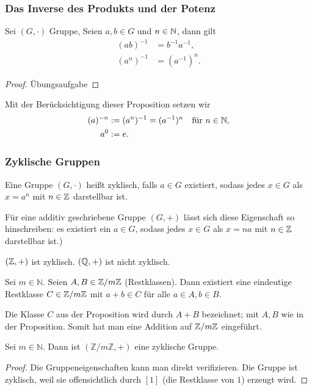 \subsubsection{Das Inverse des Produkts und der Potenz}
\begin{propn}
	Sei $ (G, \cdot) $ Gruppe, Seien $ a, b \in G $ und $ n \in \mathbb N $, dann gilt
	\begin{align}
		(ab)^{-1} &= b^{-1} a^{-1},\\
		(a^{n})^{-1} &= (a^{-1})^{n}.
	\end{align}
\end{propn}
\begin{proof}
	Übungsaufgabe
\end{proof}

\noindent Mit der Berücksichtigung dieser Proposition setzen wir 
\begin{align*}
	(a)^{-n} &:= (a^{n})^{-1} = (a^{-1})^{n} \quad\text{für } n \in \mathbb N,\\
	a^{0} &:= e. 
\end{align*}

\subsubsection{Zyklische Gruppen}
Eine Gruppe $ (G, \cdot) $ heißt zyklisch, falls $ a \in G $ existiert, sodass jedes $ x \in G $ als $ x = a^n $ mit $ n \in \mathbb Z $ darstellbar ist. 

Für eine additiv geschriebene Gruppe $ (G, +) $ lässt sich diese Eigenschaft so hinschreiben: es existiert ein $ a \in G $, sodass jedes $ x \in G $ als $ x = na $ mit $ n \in \mathbb Z $ darstellbar ist.)


\begin{bsp}
	$ (\mathbb Z, +) $ ist zyklisch. $ (\mathbb Q, +) $ ist nicht zyklisch.
\end{bsp}

\begin{propn}
	Sei $ m \in \mathbb{N} $. Seien $ A,B \in \mathbb Z / m\mathbb{Z} $ (Restklassen). Dann existiert eine eindeutige Restklasse $ C \in \mathbb Z/m\mathbb Z $ mit $ a+b \in C $ für alle $ a \in A, b \in B $.
\end{propn}

\noindent Die Klasse $ C $ aus der Proposition wird durch $ A+B $ bezeichnet; mit $ A,B $ wie in der Proposition. Somit hat man eine Addition auf $ \mathbb Z/m\mathbb Z $ eingeführt.

\begin{propn}
	Sei $ m \in \mathbb{N} $. Dann ist $ ( \mathbb{Z} / m\mathbb{Z} , +) $ eine zyklische Gruppe.
\end{propn}
\begin{proof}
	Die Gruppeneigenschaften kann man direkt verifizieren. Die Gruppe ist zyklisch, weil sie offensichtlich durch $[1]$ (die Restklasse von $1$) erzeugt wird. 
\end{proof}

